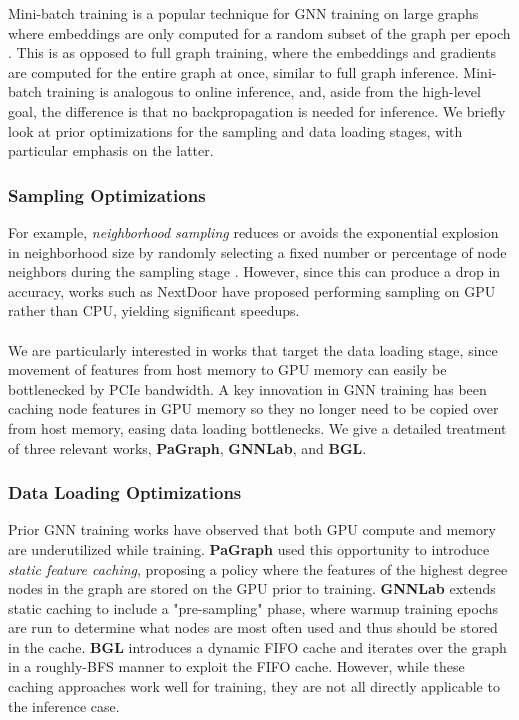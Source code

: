 Mini-batch training is a popular technique for GNN training on large graphs where embeddings are only computed for a random subset of the graph per epoch \cite{BGL_2023}. 
This is as opposed to full graph training, where the embeddings and gradients are computed for the entire graph at once, similar to full graph inference.
Mini-batch training is analogous to online inference, and, aside from the high-level goal, the difference is that no backpropagation is needed for inference. We briefly look at prior optimizations for the sampling and data loading stages, with particular emphasis on the latter.

\subsubsection{Sampling Optimizations}
For example, \textit{neighborhood sampling} reduces or avoids the exponential explosion in neighborhood size by randomly selecting a fixed number or percentage of node neighbors during the sampling stage \cite{GraphSAGE_2017}. 
However, since this can produce a drop in accuracy, works such as NextDoor \cite{NextDoor_2021} have proposed performing sampling on GPU rather than CPU, yielding significant speedups.
\\ \\ 
We are particularly interested in works that target the data loading stage, since movement of features from host memory to GPU memory can easily be bottlenecked by PCIe bandwidth.
A key innovation in GNN training has been caching node features in GPU memory so they no longer need to be copied over from host memory, easing data loading bottlenecks. We give a detailed treatment of three relevant works, \textbf{PaGraph}, \textbf{GNNLab}, and \textbf{BGL}.

\subsubsection{Data Loading Optimizations}

Prior GNN training works have observed that both GPU compute and memory are underutilized while training. 
\textbf{PaGraph} \cite{PaGraph_2020} used this opportunity to introduce \textit{static feature caching}, proposing a policy where the features of the highest degree nodes in the graph are stored on the GPU prior to training. 
\textbf{GNNLab} \cite{GNNLab_2022} extends static caching to include a "pre-sampling" phase, where warmup training epochs are run to determine what nodes are most often used and thus should be stored in the cache.
\textbf{BGL} \cite{BGL_2023} introduces a dynamic FIFO cache and iterates over the graph in a roughly-BFS manner to exploit the FIFO cache.
However, while these caching approaches work well for training, they are not all directly applicable to the inference case.

